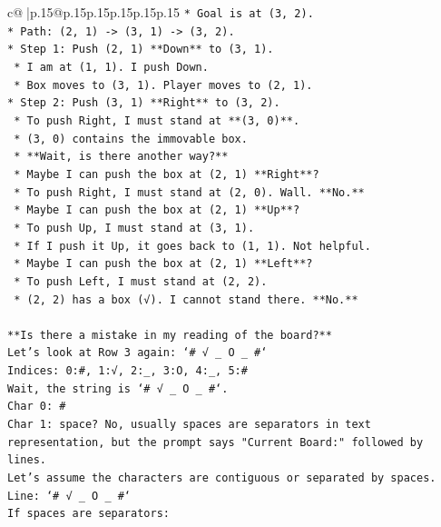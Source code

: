 \documentclass{article}
\begin{document}
{\begin{supertabular}{c@{$\;$}|p{.15\linewidth}@{}p{.15\linewidth}p{.15\linewidth}p{.15\linewidth}p{.15\linewidth}p{.15\linewidth}}
{{{\texttt{*   Goal is at (3, 2).} \\
\texttt{*   Path: (2, 1) {-}> (3, 1) {-}> (3, 2).} \\
\texttt{*   Step 1: Push (2, 1) **Down** to (3, 1).} \\
\texttt{    *   I am at (1, 1). I push Down.} \\
\texttt{    *   Box moves to (3, 1). Player moves to (2, 1).} \\
\texttt{*   Step 2: Push (3, 1) **Right** to (3, 2).} \\
\texttt{    *   To push Right, I must stand at **(3, 0)**.} \\
\texttt{    *   (3, 0) contains the immovable box.} \\
\texttt{    *   **Wait, is there another way?**} \\
\texttt{    *   Maybe I can push the box at (2, 1) **Right**?} \\
\texttt{    *   To push Right, I must stand at (2, 0). Wall. **No.**} \\
\texttt{    *   Maybe I can push the box at (2, 1) **Up**?} \\
\texttt{    *   To push Up, I must stand at (3, 1).} \\
\texttt{    *   If I push it Up, it goes back to (1, 1). Not helpful.} \\
\texttt{    *   Maybe I can push the box at (2, 1) **Left**?} \\
\texttt{    *   To push Left, I must stand at (2, 2).} \\
\texttt{    *   (2, 2) has a box (√). I cannot stand there. **No.**} \\
\\ 
\texttt{**Is there a mistake in my reading of the board?**} \\
\texttt{Let's look at Row 3 again: `\# √ \_ O \_ \#`} \\
\texttt{Indices: 0:\#, 1:√, 2:\_, 3:O, 4:\_, 5:\#} \\
\texttt{Wait, the string is `\# √ \_ O \_ \#`.} \\
\texttt{Char 0: \#} \\
\texttt{Char 1: space? No, usually spaces are separators in text representation, but the prompt says "Current Board:" followed by lines.} \\
\texttt{Let's assume the characters are contiguous or separated by spaces.} \\
\texttt{Line: `\# √ \_ O \_ \#`} \\
\texttt{If spaces are separators:} \\
}}}
\end{supertabular}}
\end{document}
